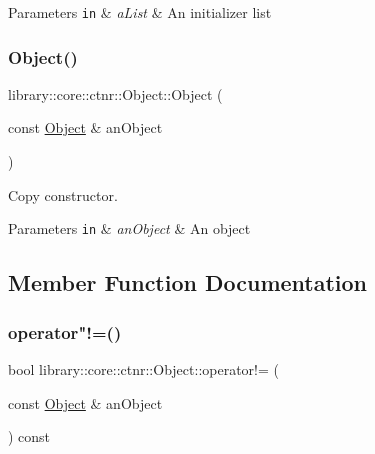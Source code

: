 \begin{DoxyParams}[1]{Parameters}
\mbox{\tt in}  & {\em a\+List} & An initializer list \\
\hline
\end{DoxyParams}
\mbox{\label{classlibrary_1_1core_1_1ctnr_1_1_object_a90f9c4579306498a5da413ac89ac0109}} 
\subsubsection{\texorpdfstring{Object()}{Object()}\hspace{0.1cm}{\footnotesize\ttfamily [2/2]}}
{\footnotesize\ttfamily library\+::core\+::ctnr\+::\+Object\+::\+Object (\begin{DoxyParamCaption}\item[{const \hyperlink{classlibrary_1_1core_1_1ctnr_1_1_object}{Object} \&}]{an\+Object }\end{DoxyParamCaption})}



Copy constructor. 


\begin{DoxyParams}[1]{Parameters}
\mbox{\tt in}  & {\em an\+Object} & An object \\
\hline
\end{DoxyParams}


\subsection{Member Function Documentation}
\mbox{\label{classlibrary_1_1core_1_1ctnr_1_1_object_a8544bc0fbc6db8b12c8dabd51b075aa5}} 
\subsubsection{\texorpdfstring{operator"!=()}{operator!=()}}
{\footnotesize\ttfamily bool library\+::core\+::ctnr\+::\+Object\+::operator!= (\begin{DoxyParamCaption}\item[{const \hyperlink{classlibrary_1_1core_1_1ctnr_1_1_object}{Object} \&}]{an\+Object }\end{DoxyParamCaption}) const}



